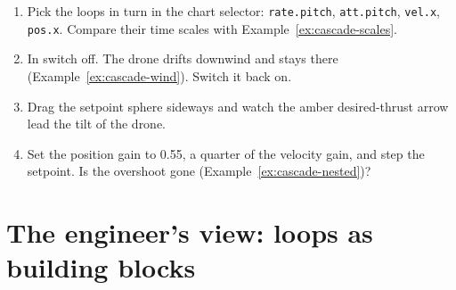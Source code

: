 \begin{trythis}
\begin{enumerate}
  \item Pick the loops in turn in the chart selector: \texttt{rate.pitch}, \texttt{att.pitch}, \texttt{vel.x}, \texttt{pos.x}. Compare their time scales with Example~\ref{ex:cascade-scales}.
  \item In  switch \It off. The drone drifts downwind and stays there (Example~\ref{ex:cascade-wind}). Switch it back on.
  \item Drag the setpoint sphere sideways and watch the amber desired-thrust arrow lead the tilt of the drone.
  \item Set the position gain to 0.55, a quarter of the velocity gain, and step the setpoint. Is the overshoot gone (Example~\ref{ex:cascade-nested})?
\end{enumerate}
\end{trythis}

\section{The engineer's view: loops as building blocks}

